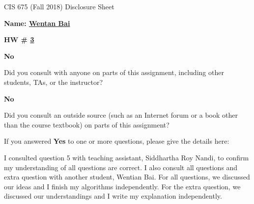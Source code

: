 \documentclass[12pt]{article}
\newcommand*\circled[1]{\tikz[baseline=(char.base)]{
            \node[shape=circle,draw,inner sep=2pt] (char) {#1};}}
\begin{document}
\begin{center}
  \Large
  CIS 675 (Fall 2018) Disclosure Sheet 
\end{center} 
\vspace*{2em}

\noindent
\textbf{\Large Name: \underline{ Wentan Bai }} 


\noindent 
\begin{minipage}[t]{1.0\linewidth}

\begin{minipage}[t]{0.25\linewidth}
\textbf{\Large
  HW \# \underline{ 3 }
} 

\end{minipage} \vspace*{3ex}




\begin{minipage}[t]{.8in}
  \textbf{\circled{Yes} \quad No}
\end{minipage}
\qquad 
\begin{minipage}[t]{5.5in}
  Did you consult with anyone on parts of this assignment, including other students, TAs, or the instructor? 
\end{minipage}
\vspace*{1ex}

\begin{minipage}[t]{.8in}
  \textbf{\circled{Yes} \quad No}
\end{minipage}
\qquad 
\begin{minipage}[t]{5.5in}
  Did you consult an outside source (such as an Internet forum or a
  book other than the course textbook) on parts of this assignment? 
\end{minipage}
\vspace*{1ex}

\noindent
  If you answered \textbf{Yes} to one or more questions, please give the details here: \vspace*{5ex} \par
  I consulted question 5 with teaching assistant, Siddhartha Roy Nandi, to confirm my understanding of all questions are correct. 
  I also consult all questions and extra question with another student, Wentian Bai. For all questions, we discussed our ideas and I finish my algorithms independently. 
  For the extra question, we discussed our understandings and I write my explanation independently.  \vspace*{5ex} \\

 

\vfill
\end{minipage}
\end{document}
